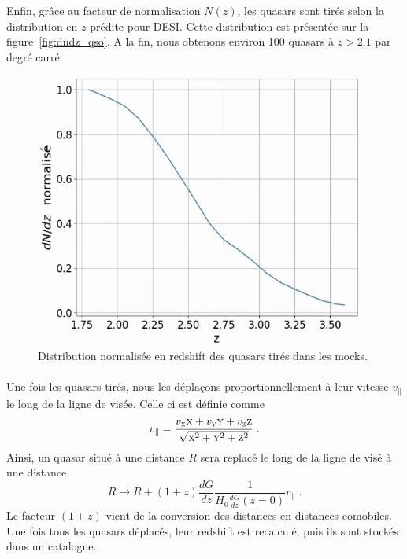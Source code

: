 \documentclass[11pt, twoside, a4paper, openright]{report}
\begin{document}
Enfin, grâce au facteur de normalisation $N(z)$, les quasars sont tirés selon la distribution en $z$ prédite pour DESI. Cette distribution est présentée sur la figure~\ref{fig:dndz_qso}. A la fin, nous obtenons environ \num{100} quasars à $z > \num{2.1}$ par degré carré.
\begin{figure}
  \centering
  \includegraphics[scale=0.5]{dndz_qso}
  \caption{Distribution normalisée en redshift des quasars tirés dans les mocks.}
\end{figure}

\paragraph{}
Une fois les quasars tirés, nous les déplaçons proportionnellement à leur vitesse $v_{\parallel}$ le long de la ligne de visée. Celle ci est définie comme
\begin{equation}
  v_{\parallel} = \frac{v_{\textsc{x}} \textsc{x} + v_{\textsc{y}} \textsc{y} + v_{\textsc{z}} \textsc{z}}{\sqrt{\textsc{x}^2 + \textsc{y}^2 + \textsc{z}^2}} \; .
\end{equation}
Ainsi, un quasar situé à une distance $R$ sera replacé le long de la ligne de visé à une distance
\begin{equation}
 R \rightarrow  R + (1+z) \frac{dG}{dz} \frac{1}{H_0 \frac{dG}{dz}(z=0)} v_{\parallel} \; .
\end{equation}
Le facteur $(1+z)$ vient de la conversion des distances en distances comobiles. Une fois tous les quasars déplacés, leur redshift est recalculé, puis ils sont stockés dans un catalogue.
\end{document}
